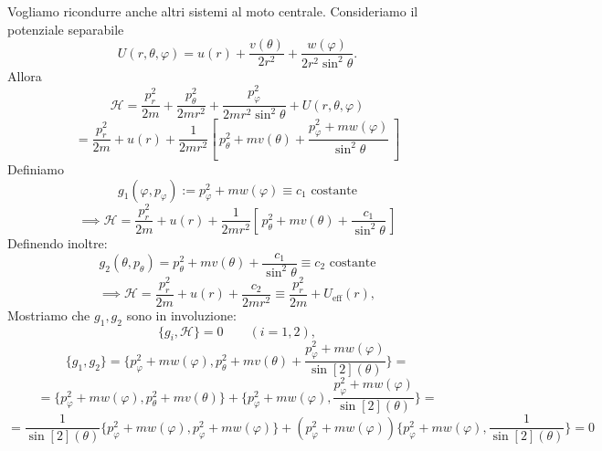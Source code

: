 \begin{example}
    Vogliamo ricondurre anche altri sistemi al moto centrale. Consideriamo il potenziale separabile
    \begin{equation}
        U(r,\theta,\varphi)=u(r)+\frac{v(\theta)}{2r^2}+\frac{w(\varphi)}{2r^2\sin^2\theta}.
    \end{equation}
    Allora
    \begin{equation}
        \mathcal{H}=\frac{p_r^2}{2m}+\frac{p_\theta^2}{2mr^2}+\frac{p_\varphi^2}{2mr^2\sin^2\theta}+U(r,\theta,\varphi)
    \end{equation}
    \begin{equation}
        =\frac{p_r^2}{2m}+u(r)+\frac{1}{2mr^2}\left[\,p_\theta^2+m v(\theta)+\frac{p_\varphi^2+m w(\varphi)}{\sin^2\theta}\,\right]
    \end{equation}
    Definiamo
    \begin{equation}
        g_1(\varphi,p_\varphi):=p_\varphi^2+m w(\varphi)\equiv c_1 \text{  costante}
    \end{equation}
    \begin{equation}
        \implies \mathcal{H}=\frac{p_r^2}{2m}+u(r)+\frac{1}{2mr^2} \left[\,p_\theta^2+m v(\theta)+\frac{c_1}{\sin^2\theta}\,\right]
    \end{equation}
    Definendo inoltre:
    \begin{equation*}
        g_2(\theta,p_\theta)= p_\theta^2+m v(\theta)+\frac{c_1}{\sin^2\theta} \equiv c_2 \text{  costante}
    \end{equation*}
    \begin{equation}
        \implies \mathcal{H}=\frac{p_r^2}{2m}+u(r)+\frac{c_2}{2mr^2}\equiv\frac{p_r^2}{2m}+U_{\text{eff}}(r),
    \end{equation}
    Mostriamo che $g_1,g_2$ sono in involuzione:
    \begin{equation}
        \{g_i,\mathcal{H}\}=0 \qquad (i=1,2),
    \end{equation}
    \begin{equation*}
        \{g_1,g_2\}=\{p_\varphi^2+m w(\varphi),p_\theta^2+m v(\theta)+ \frac{p_\varphi^2+m w(\varphi)}{\sin[2](\theta)}\}=
    \end{equation*}
    \begin{equation*}
        =\{p_\varphi^2+m w(\varphi), p_\theta^2+m v(\theta)\}+ \{p_\varphi^2+m w(\varphi),\frac{p_\varphi^2+m w(\varphi)}{\sin[2](\theta)}\}=
    \end{equation*}
    \begin{equation}
        = \frac{1}{\sin[2](\theta)}\{p_\varphi^2+m w(\varphi),p_\varphi^2+m w(\varphi)\}+ (p_\varphi^2+m w(\varphi))\{p_\varphi^2+m w(\varphi), \frac{1}{\sin[2](\theta)}\}=0
    \end{equation}
\end{example}

